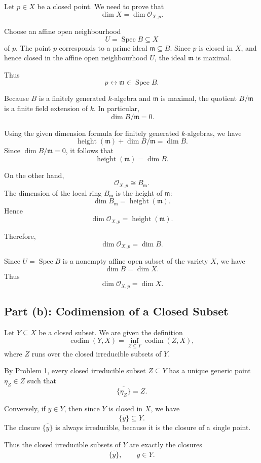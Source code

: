 \documentclass[12pt,a4paper]{article}
\DeclareMathOperator{\Spec}{Spec}
\newcommand{\codim}{\operatorname{codim}}
\providecommand{\Spec}{\operatorname{Spec}}
\theoremstyle{notespace}
\begin{document}
Let \(p\in X\) be a closed point. We need to prove that
\[
\dim X=\dim \mathcal O_{X,p}.
\]

Choose an affine open neighbourhood
\[
U=\Spec B\subseteq X
\]
of \(p\). The point \(p\) corresponds to a prime ideal \(\mathfrak m\subseteq B\). Since \(p\) is closed in \(X\), and hence closed in the affine open neighbourhood \(U\), the ideal \(\mathfrak m\) is maximal.

Thus
\[
p\leftrightarrow \mathfrak m\in \Spec B.
\]

Because \(B\) is a finitely generated \(k\)-algebra and \(\mathfrak m\) is maximal, the quotient \(B/\mathfrak m\) is a finite field extension of \(k\). In particular,
\[
\dim B/\mathfrak m=0.
\]

Using the given dimension formula for finitely generated \(k\)-algebras, we have
\[
\operatorname{height}(\mathfrak m)+\dim B/\mathfrak m=\dim B.
\]
Since \(\dim B/\mathfrak m=0\), it follows that
\[
\operatorname{height}(\mathfrak m)=\dim B.
\]

On the other hand,
\[
\mathcal O_{X,p}\cong B_{\mathfrak m}.
\]
The dimension of the local ring \(B_{\mathfrak m}\) is the height of \(\mathfrak m\):
\[
\dim B_{\mathfrak m}=\operatorname{height}(\mathfrak m).
\]
Hence
\[
\dim \mathcal O_{X,p}
=
\operatorname{height}(\mathfrak m).
\]

Therefore,
\[
\dim \mathcal O_{X,p}=\dim B.
\]

Since \(U=\Spec B\) is a nonempty affine open subset of the variety \(X\), we have
\[
\dim B=\dim X.
\]
Thus
\[
\boxed{\dim \mathcal O_{X,p}=\dim X.}
\]

\subsection{Part (b): Codimension of a Closed Subset}

Let \(Y\subseteq X\) be a closed subset. We are given the definition
\[
\codim(Y,X)
=
\inf_{Z\subseteq Y}\codim(Z,X),
\]
where \(Z\) runs over the closed irreducible subsets of \(Y\).

By Problem 1, every closed irreducible subset \(Z\subseteq Y\) has a unique generic point \(\eta_Z\in Z\) such that
\[
\overline{\{\eta_Z\}}=Z.
\]

Conversely, if \(y\in Y\), then since \(Y\) is closed in \(X\), we have
\[
\overline{\{y\}}\subseteq Y.
\]
The closure \(\overline{\{y\}}\) is always irreducible, because it is the closure of a single point.

Thus the closed irreducible subsets of \(Y\) are exactly the closures
\[
\overline{\{y\}},
\qquad y\in Y.
\]
\end{document}
